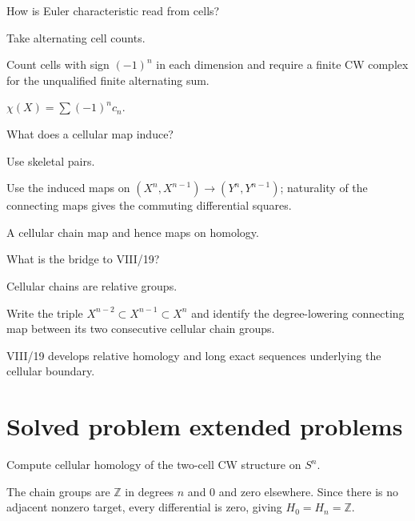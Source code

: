 \begin{exercise}\label{exr:viii18-22}
How is Euler characteristic read from cells?
\end{exercise}
\begin{hint}
Take alternating cell counts.

Count cells with sign \((-1)^n\) in each dimension and require a finite CW complex for the unqualified finite alternating sum.
\end{hint}
\begin{solution}
\(\chi(X)=\sum(-1)^nc_n\).
\end{solution}

\begin{exercise}\label{exr:viii18-23}
What does a cellular map induce?
\end{exercise}
\begin{hint}
Use skeletal pairs.

Use the induced maps on \((X^n,X^{n-1})\to(Y^n,Y^{n-1})\); naturality of the connecting maps gives the commuting differential squares.
\end{hint}
\begin{solution}
A cellular chain map and hence maps on homology.
\end{solution}

\begin{exercise}\label{exr:viii18-24}
What is the bridge to VIII/19?
\end{exercise}
\begin{hint}
Cellular chains are relative groups.

Write the triple \(X^{n-2}\subset X^{n-1}\subset X^n\) and identify the degree-lowering connecting map between its two consecutive cellular chain groups.
\end{hint}
\begin{solution}
VIII/19 develops relative homology and long exact sequences underlying the cellular boundary.
\end{solution}


\section{Solved problem extended problems}

\begin{problem}\label{prob:viii18-01}
Compute cellular homology of the two-cell CW structure on \(S^n\).
\end{problem}
\begin{solution}
The chain groups are \(\mathbb Z\) in degrees \(n\) and \(0\) and zero elsewhere. Since there is no adjacent nonzero target, every differential is zero, giving \(H_0=H_n=\mathbb Z\).
\end{solution}

